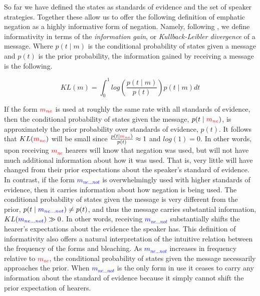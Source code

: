 \documentclass[linguex]{sp}
\theoremstyle{definition} \newtheorem{definition}{Definition}
\begin{document}
So far we have defined the states as standards of evidence and the set of speaker strategies. Together these allow us to offer the following definition of emphatic negation as a highly informative form of negation. Namely, following \cite{skyrms:2010}, we define informativity in terms of the \emph{information gain}, or \emph{Kullback-Leibler divergence} \citeyearpar{kullback-leibler1951divergence} of a message. Where $p(t \mid m)$ is the conditional probability of states given a message and $p(t)$ is the prior probability, the information gained by receiving a message is the following.



\begin{equation}
     KL( m ) = \int_0^1 log\left( \frac{p(t \mid m )}{p(t)}  \right)p(t \mid m ) dt
\end{equation}

If the form $\textcolor{red}{m_{ne}}$ is used at roughly the same rate with all standards of evidence, then the conditional probability of states given the message, $p(t \mid \textcolor{red}{m_{ne}})$, is approximately the prior probability over standards of evidence, $p(t)$. It follows that $KL(\textcolor{red}{m_{ne}})$ will be small since $\frac{p(t \mid \textcolor{red}{m_{ne}})}{p(t)} \approx 1$ and $log(1) = 0$. In other words, upon receiving \textcolor{red}{$m_{ne}$} hearers will know that negation was used, but will not have much additional information about how it was used. That is, very little will have changed from their prior expectations about the speaker's standard of evidence.  In contrast, if the form \textcolor{blue}{$m_{ne...not}$} is overwhelmingly used with higher standards of evidence, then it carries information about how negation is being used. The conditional probability of states given the message is very different from the prior, $p(t \mid \textcolor{blue}{m_{ne...not}}) \neq p(t)$, and thus the message carries substantial information, $KL(\textcolor{blue}{m_{ne...not}}) \gg 0$.  In other words, receiving \textcolor{blue}{$m_{ne...not}$} substantially shifts the hearer's expectations about the evidence the speaker has.   This definition of informativity also offers a natural interpretation of the intuitive relation between the frequency of the forms and bleaching. As \textcolor{blue}{$m_{ne...not}$} increases in frequency relative to \textcolor{red}{$m_{ne}$}, the conditional probability of states given the message necessarily approaches the prior. When \textcolor{blue}{$m_{ne...not}$} is the only form in use it ceases to carry any information about the standard of evidence because it simply cannot shift the prior expectation of hearers.
\end{document}
